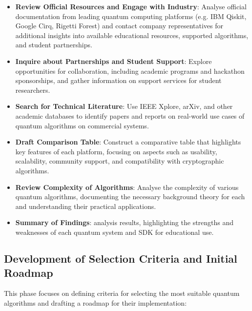 \documentclass[11pt,a4paper]{article}
\begin{document}
\begin{itemize}
	\item \textbf{Review Official Resources and Engage with Industry}: Analyse official documentation from leading quantum computing platforms 
		(e.g. IBM Qiskit, Google Cirq, Rigetti Forest) and contact company representatives for additional insights into available educational 
		resources, supported algorithms, and student partnerships.
	\item \textbf{Inquire about Partnerships and Student Support}: Explore opportunities for collaboration, including academic programs and 
		hackathon sponsorships, and gather information on support services for student researchers.
	\item \textbf{Search for Technical Literature}: Use IEEE Xplore, arXiv, and other academic databases to identify papers and reports on real-world 
		use cases of quantum algorithms on commercial systems.
	\item \textbf{Draft Comparison Table}: Construct a comparative table that highlights key features of each platform, focusing on aspects such as 
		usability, scalability, community support, and compatibility with cryptographic algorithms.
	\item \textbf{Review Complexity of Algorithms}: Analyse the complexity of various quantum algorithms, documenting the necessary background 
		theory for each and understanding their practical applications.
	\item \textbf{Summary of Findings}: analysis results, highlighting the strengths and weaknesses of each quantum system and SDK for educational use.
\end{itemize}

\subsection{Development of Selection Criteria and Initial Roadmap}

This phase focuses on defining criteria for selecting the most suitable quantum algorithms and drafting a roadmap for their implementation:
\end{document}
